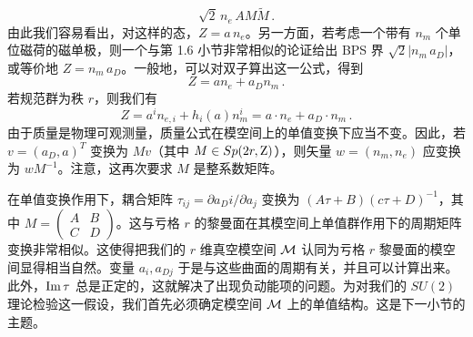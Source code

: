 $$
\sqrt{2}\,n_e \, A M \widetilde M\,.
$$
由此我们容易看出，对这样的态，$Z=a\,n_e$。另一方面，若考虑一个带有 $n_m$ 个单位磁荷的磁单极，则一个与第 1.6 小节非常相似的论证给出 BPS 界 $\sqrt{2}|n_m\,a_D|$，或等价地 $Z=n_m\,a_D$。一般地，可以对双子算出这一公式，得到
\begin{equation}
Z = a n_e + a_D n_m\,.
\label{ZaaD}
\end{equation}
若规范群为秩 $r$，则我们有
$$
Z = a^i n_{e,i} + h_i(a) n^i_m =a\cdot n_e +a_D \cdot n_m\,.
$$
由于质量是物理可观测量，质量公式在模空间上的单值变换下应当不变。因此，若 $v=(a_D, a)^T$ 变换为 $M v$（其中 $M\in Sp(2r,{\rm Z})$），则矢量 $w= (n_m, n_e)$ 应变换为 $w M^{-1}$。注意，这再次要求 $M$ 是整系数矩阵。


在单值变换作用下，耦合矩阵 $\tau_{ij}=\partial a_Di/\partial a_j$ 变换为 $(A\tau+B)(c\tau+D)^{-1}$，其中 $M=\left(\begin{array}{cc}A&B\\C&D\end{array}\right)$。这与亏格 $r$ 的黎曼面在其模空间上单值群作用下的周期矩阵变换非常相似。这使得把我们的 $r$ 维真空模空间 ${\cal M}$ 认同为亏格 $r$ 黎曼面的模空间显得相当自然。变量 $a_i,a_{Dj}$ 于是与这些曲面的周期有关，并且可以计算出来。此外，${\rm Im}\,\tau$ 总是正定的，这就解决了出现负动能项的问题。为对我们的 $SU(2)$ 理论检验这一假设，我们首先必须确定模空间 ${\cal M}$ 上的单值结构。这是下一小节的主题。

